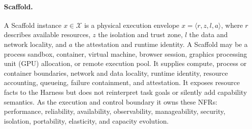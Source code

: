 \paragraph{Scaffold.}
A Scaffold instance $x\in\mathcal{X}$ is a physical execution envelope $x=\langle r,z,l,a\rangle$, where $r$ describes available resources, $z$ the isolation and trust zone, $l$ the data and network locality, and $a$ the attestation and runtime identity. A Scaffold may be a process sandbox, container, virtual machine, browser session, graphics processing unit (GPU) allocation, or remote execution pool. It supplies compute, process or container boundaries, network and data locality, runtime identity, resource accounting, queueing, failure containment, and attestation. It exposes resource facts to the Harness but does not reinterpret task goals or silently add capability semantics. As the execution and control boundary it owns these NFRs: performance, reliability, availability, observability, manageability, security, isolation, portability, elasticity, and capacity evolution.


